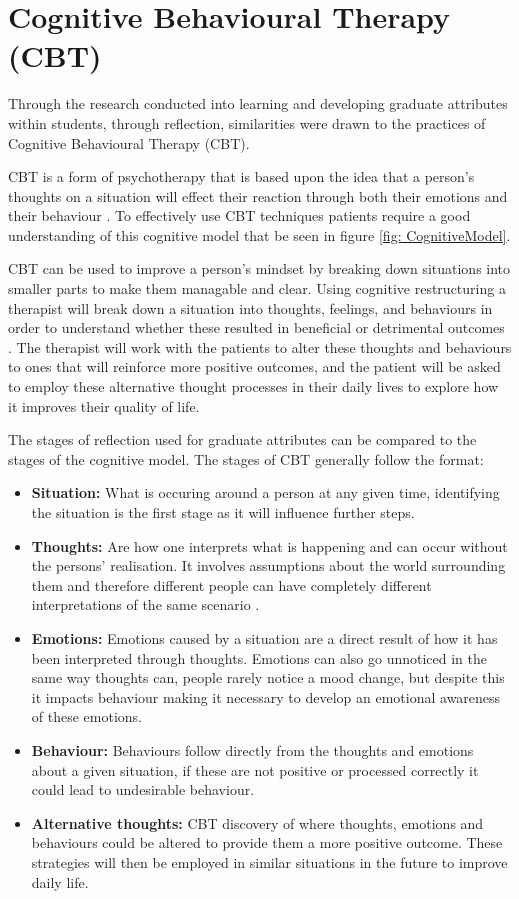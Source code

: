 \documentclass{l4proj}
\begin{document}
\section{Cognitive Behavioural Therapy (CBT)}

Through the research conducted into learning and developing graduate attributes within students, through reflection, similarities were drawn to the practices of Cognitive Behavioural Therapy (CBT). 

CBT is a form of psychotherapy that is based upon the idea that a person's thoughts on a situation will effect their reaction through both their emotions and their behaviour \citep{whatisCBT_therapistAid}. To effectively use CBT techniques patients require a good understanding of this cognitive model that be seen in figure \ref{fig: CognitiveModel}. 

CBT can be used to improve a person's mindset by breaking down situations into smaller parts to make them managable and clear. Using cognitive restructuring a therapist will break down a situation into thoughts, feelings, and behaviours in order to understand whether these resulted in beneficial or detrimental outcomes \citep{nhs_cognitive_2017}. The therapist will work with the patients to alter these thoughts and behaviours to ones that will reinforce more positive outcomes, and the patient will be asked to employ these alternative thought processes in their daily lives to explore how it improves their quality of life. 

The stages of reflection used for graduate attributes can be compared to the stages of the cognitive model. The stages of CBT generally follow the format:
\begin{itemize}
    \item \textbf{Situation:} What is occuring around a person at any given time, identifying the situation is the first stage as it will influence further steps.
    \item \textbf{Thoughts:} Are how one interprets what is happening and can occur without the persons' realisation. It involves assumptions about the world surrounding them and therefore different people can have completely different interpretations of the same scenario \citep{therapist_aid_psychoeducation}. 
    \item \textbf{Emotions:} Emotions caused by a situation are a direct result of how it has been interpreted through thoughts. Emotions can also go unnoticed in the same way thoughts can, people rarely notice a mood change, but despite this it impacts behaviour making it necessary to develop an emotional awareness of these emotions.
    \item \textbf{Behaviour:} Behaviours follow directly from the thoughts and emotions about a given situation, if these are not positive or processed correctly it could lead to undesirable behaviour.
    \item \textbf{Alternative thoughts:} CBT discovery of where thoughts, emotions and behaviours could be altered to provide them a more positive outcome. These strategies will then be employed in similar situations in the future to improve daily life.
\end{itemize}
\end{document}
